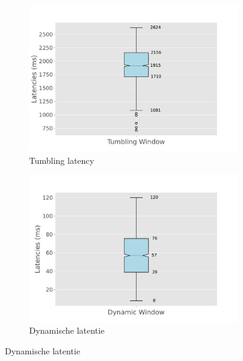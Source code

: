 \begin{figure}[htbp]
\begin{subfigure}[b]{0.5\columnwidth}
        \label{fig:constant_thorughput}
    \end{subfigure}
    \\
    \begin{subfigure}[b]{0.5\columnwidth}
        \includegraphics[width=\columnwidth]{fig/constant-rate/TumblingWindow_latency_boxplot.pdf}
        \caption{Tumbling latency}
        \label{fig:constant_tumb_boxplot}
    \end{subfigure}
    \begin{subfigure}[b]{0.5\columnwidth}
        \includegraphics[width=\columnwidth]{fig/constant-rate/DynamicWindow_latency_boxplot.pdf}
        \caption{Dynamische latentie}
        \label{fig:constant_dynamic_boxplot}
    \end{subfigure}

\end{figure}
